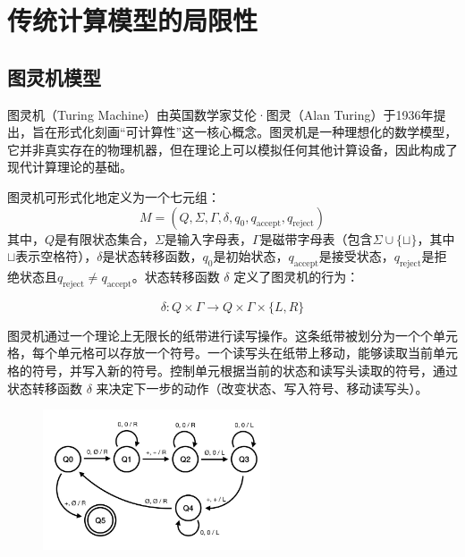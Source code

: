 \documentclass[UTF8,openany,zihao=5]{ctexbook}
\begin{document}
\chapter{传统计算模型的局限性}
\label{sec:traditional_computing_limitations}

\section{图灵机模型}

图灵机（Turing Machine）由英国数学家艾伦·图灵（Alan Turing）于1936年提出，旨在形式化刻画“可计算性”这一核心概念。图灵机是一种理想化的数学模型，它并非真实存在的物理机器，但在理论上可以模拟任何其他计算设备，因此构成了现代计算理论的基础。

图灵机可形式化地定义为一个七元组：
$$
M = (Q, \Sigma, \Gamma, \delta, q_0, q_{\text{accept}}, q_{\text{reject}})
$$
其中，$Q$是有限状态集合，$\Sigma$是输入字母表，$\Gamma$是磁带字母表（包含$\Sigma \cup \{\sqcup\}$，其中$\sqcup$表示空格符），$\delta$是状态转移函数，$q_0$是初始状态，$q_{\text{accept}}$是接受状态，$q_{\text{reject}}$是拒绝状态且$q_{\text{reject}} \neq q_{\text{accept}}$。状态转移函数 $\delta$ 定义了图灵机的行为：

$$
\delta: Q \times \Gamma \rightarrow Q \times \Gamma \times \{L, R\}
$$

图灵机通过一个理论上无限长的纸带进行读写操作。这条纸带被划分为一个个单元格，每个单元格可以存放一个符号。一个读写头在纸带上移动，能够读取当前单元格的符号，并写入新的符号。控制单元根据当前的状态和读写头读取的符号，通过状态转移函数 $\delta$ 来决定下一步的动作（改变状态、写入符号、移动读写头）。

\begin{figure}[h]
  \begin{center}
    \includegraphics[width=0.6\textwidth]{images/turing.jpg}
    \centering
  \end{center}
  \vspace{-3ex}
\end{figure}
\end{document}
